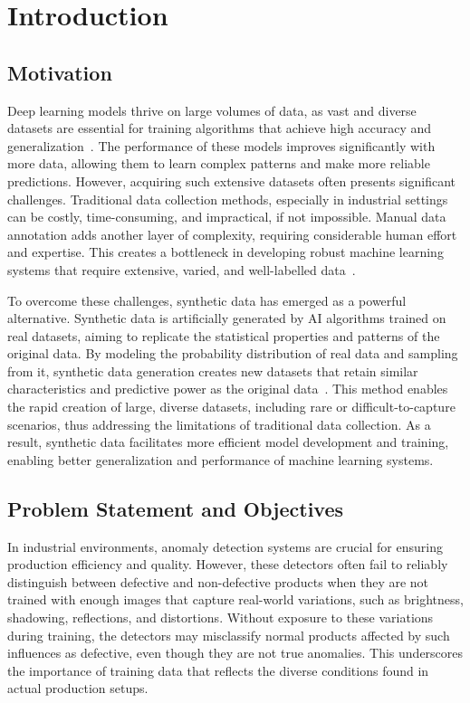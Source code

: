\documentclass[12pt,DIV14,BCOR12mm,a4paper,footinclude=false,headinclude,parskip=half-,twoside,openright,cleardoublepage=empty,toc=index,bibliography=totoc,listof=totoc]{scrreprt}
\numberwithin{equation}{chapter}
\begin{document}
{} %
\tableofcontents
\cleardoublepage
\setcounter{page}{1}


\chapter{Introduction}
\section{Motivation}
Deep learning models thrive on large volumes of data, as vast and diverse datasets are essential for training algorithms that achieve high accuracy and generalization~\cite{r1}. The performance of these models improves significantly with more data, allowing them to learn complex patterns and make more reliable predictions. However, acquiring such extensive datasets often presents significant challenges. Traditional data collection methods, especially in industrial settings can be costly, time-consuming, and impractical, if not impossible. Manual data annotation adds another layer of complexity, requiring considerable human effort and expertise. This creates a bottleneck in developing robust machine learning systems that require extensive, varied, and well-labelled data~\cite{anderson2022synthetic}.

To overcome these challenges, synthetic data has emerged as a powerful alternative. Synthetic data is artificially generated by AI algorithms trained on real datasets, aiming to replicate the statistical properties and patterns of the original data. By modeling the probability distribution of real data and sampling from it, synthetic data generation creates new datasets that retain similar characteristics and predictive power as the original data~\cite{r2}. This method enables the rapid creation of large, diverse datasets, including rare or difficult-to-capture scenarios, thus addressing the limitations of traditional data collection. As a result, synthetic data facilitates more efficient model development and training, enabling better generalization and performance of machine learning systems.

\section{Problem Statement and Objectives}
In industrial environments, anomaly detection systems are crucial for ensuring production efficiency and quality. However, these detectors often fail to reliably distinguish between defective and non-defective products when they are not trained with enough images that capture real-world variations, such as brightness, shadowing, reflections, and distortions. Without exposure to these variations during training, the detectors may misclassify normal products affected by such influences as defective, even though they are not true anomalies. This underscores the importance of training data that reflects the diverse conditions found in actual production setups.
\end{document}
